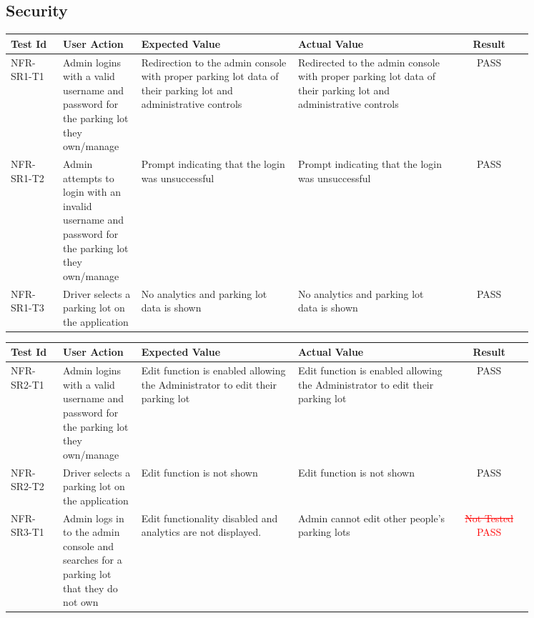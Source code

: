 \documentclass[12pt, titlepage]{article}
\begin{document}
\subsection{Security}
\begin{center}
\begin{tabular}{|p{0.10\linewidth}|p{0.15\linewidth}|p{0.30\linewidth}|p{0.30\linewidth}|c|} 
\hline
\textbf{Test Id} & \textbf{User Action} & \textbf{Expected Value} &
\textbf{Actual Value} & \textbf{Result} \\
\hline 
NFR-SR1-T1 & Admin logins with a valid username and password for the parking lot
they own/manage & Redirection to the admin console with proper parking lot data
of their parking lot and administrative controls & Redirected to the admin
console with proper parking lot data of their parking lot and administrative
controls & \textcolor{OliveGreen}{PASS}\\
\hline 
NFR-SR1-T2 & Admin attempts to login with an invalid username and password for
the parking lot they own/manage & Prompt indicating that the login was
unsuccessful & Prompt indicating that the login was unsuccessful &
\textcolor{OliveGreen}{PASS}\\
\hline 
NFR-SR1-T3 & Driver selects a parking lot on the application & No analytics and
parking lot data is shown & No analytics and parking lot data is shown &
\textcolor{OliveGreen}{PASS}\\
\hline
\end{tabular}

\begin{tabular}{|p{0.10\linewidth}|p{0.15\linewidth}|p{0.30\linewidth}|p{0.30\linewidth}|c|} 
\hline
\textbf{Test Id} & \textbf{User Action} & \textbf{Expected Value} &
\textbf{Actual Value} & \textbf{Result} \\
\hline
NFR-SR2-T1 & Admin logins with a valid username and password for the parking lot
they own/manage & Edit function is enabled allowing the Administrator to edit
their parking lot & Edit function is enabled allowing the Administrator to edit
their parking lot & \textcolor{OliveGreen}{PASS}\\
\hline 
NFR-SR2-T2 & Driver selects a parking lot on the application & Edit function is
not shown &  Edit function is not shown & \textcolor{OliveGreen}{PASS}\\
\hline
NFR-SR3-T1 & Admin logs in to the admin console and searches for a parking lot
that they do not own & Edit functionality disabled and analytics are not
displayed. & Admin cannot edit other people's parking lots &
\textcolor{red}{\st{Not Tested} PASS}\\
\hline
\end{tabular}


\end{center}
\end{document}
